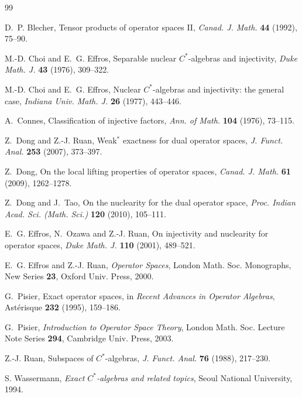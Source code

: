 \documentclass[12pt]{article}
\theoremstyle{definition}
\theoremstyle{remark}
\begin{document}
\begin{thebibliography}{99}

 D.~P. Blecher, Tensor products of operator spaces II,
\emph{Canad. J. Math.} \textbf{44} (1992), 75--90.

 M.-D. Choi and E.~G. Effros, Separable nuclear $C^*$-algebras
and injectivity, \emph{Duke Math. J.} \textbf{43} (1976), 309--322.

 M.-D. Choi and E.~G. Effros, Nuclear $C^*$-algebras and
injectivity: the general case, \emph{Indiana Univ. Math. J.} \textbf{26}
(1977), 443--446.

 A.~Connes, Classification of injective factors,
\emph{Ann. of Math.} \textbf{104} (1976), 73--115.

 Z.~Dong and Z.-J. Ruan, Weak$^*$ exactness for dual operator
spaces, \emph{J. Funct. Anal.} \textbf{253} (2007), 373--397.

 Z.~Dong, On the local lifting properties of operator spaces,
\emph{Canad. J. Math.} \textbf{61} (2009), 1262--1278.

 Z.~Dong and J.~Tao, On the nuclearity for the dual operator
space, \emph{Proc. Indian Acad. Sci. (Math. Sci.)} \textbf{120} (2010),
105--111.

 E.~G. Effros, N.~Ozawa and Z.-J. Ruan, On injectivity and
nuclearity for operator spaces, \emph{Duke Math. J.} \textbf{110} (2001),
489--521.

 E.~G. Effros and Z.-J. Ruan, \emph{Operator Spaces}, London
Math. Soc. Monographs, New Series \textbf{23}, Oxford Univ. Press, 2000.

 G.~Pisier, Exact operator spaces, in \emph{Recent Advances in
Operator Algebras}, Astérisque \textbf{232} (1995), 159--186.

 G.~Pisier, \emph{Introduction to Operator Space Theory}, London
Math. Soc. Lecture Note Series \textbf{294}, Cambridge Univ. Press, 2003.

 Z.-J. Ruan, Subspaces of $C^*$-algebras,
\emph{J. Funct. Anal.} \textbf{76} (1988), 217--230.

 S. Wassermann, \emph{Exact $C^*$-algebras and related topics},
Seoul National University, 1994.

\end{thebibliography}
\end{document}
